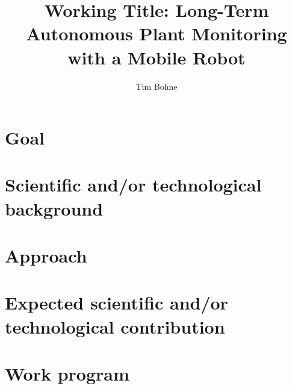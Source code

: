 \documentclass[german, master, expose, latin1]{base/thesis_KBS}
\begin{document}
\title{Working Title: Long-Term Autonomous Plant Monitoring with a Mobile Robot}
\author{Tim Bohne}

\generatetitle

\section{Goal}

\section{Scientific and/or technological background}

\section{Approach}

\section{Expected scientific and/or technological contribution}

\section{Work program}



\end{document}
